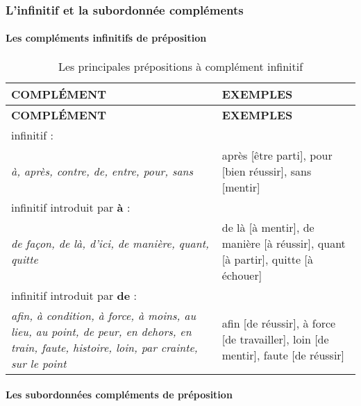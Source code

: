 \documentclass[UTF8]{report}
\begin{document}
\subsubsection{L’infinitif et la subordonnée compléments}

\paragraph{Les compléments infinitifs de préposition}

\begin{table}[H]
    \centering
    \begin{longtable}{|m{7cm}|m{8cm}|}
    \hline
    \textbf{COMPLÉMENT} & \textbf{EXEMPLES} \\
    \hline
    \endfirsthead
    \hline
    \textbf{COMPLÉMENT} & \textbf{EXEMPLES} \\
    \hline
    \endhead
    \hline
    \endfoot
    \hline
    \endlastfoot
    
    infinitif : & \\
    \textit{à, après, contre, de, entre, pour, sans} & après [être parti], pour [bien réussir], sans [mentir] \\
    \hline
    infinitif introduit par \textbf{à} : & \\
    \textit{de façon, de là, d'ici, de manière, quant, quitte} & de là [à mentir], de manière [à réussir], quant [à partir], quitte [à échouer] \\
    \hline
    infinitif introduit par \textbf{de} : & \\
    \textit{afin, à condition, à force, à moins, au lieu, au point, de peur, en dehors, en train, faute, histoire, loin, par crainte, sur le point} & afin [de réussir], à force [de travailler], loin [de mentir], faute [de réussir] \\
    \hline
    \end{longtable}
    \caption{Les principales prépositions à complément infinitif}
\end{table}

\paragraph{Les subordonnées compléments de préposition}
\end{document}
